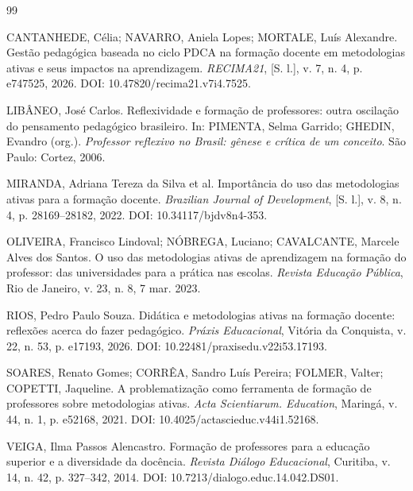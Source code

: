 \begin{thebibliography}{99}

CANTANHEDE, Célia; NAVARRO, Aniela Lopes; MORTALE, Luís Alexandre. Gestão pedagógica baseada no ciclo PDCA na formação docente em metodologias ativas e seus impactos na aprendizagem. \textit{RECIMA21}, [S. l.], v. 7, n. 4, p. e747525, 2026. DOI: 10.47820/recima21.v7i4.7525.

LIBÂNEO, José Carlos. Reflexividade e formação de professores: outra oscilação do pensamento pedagógico brasileiro. In: PIMENTA, Selma Garrido; GHEDIN, Evandro (org.). \textit{Professor reflexivo no Brasil: gênese e crítica de um conceito}. São Paulo: Cortez, 2006.

MIRANDA, Adriana Tereza da Silva et al. Importância do uso das metodologias ativas para a formação docente. \textit{Brazilian Journal of Development}, [S. l.], v. 8, n. 4, p. 28169--28182, 2022. DOI: 10.34117/bjdv8n4-353.

OLIVEIRA, Francisco Lindoval; NÓBREGA, Luciano; CAVALCANTE, Marcele Alves dos Santos. O uso das metodologias ativas de aprendizagem na formação do professor: das universidades para a prática nas escolas. \textit{Revista Educação Pública}, Rio de Janeiro, v. 23, n. 8, 7 mar. 2023.

RIOS, Pedro Paulo Souza. Didática e metodologias ativas na formação docente: reflexões acerca do fazer pedagógico. \textit{Práxis Educacional}, Vitória da Conquista, v. 22, n. 53, p. e17193, 2026. DOI: 10.22481/praxisedu.v22i53.17193.

SOARES, Renato Gomes; CORRÊA, Sandro Luís Pereira; FOLMER, Valter; COPETTI, Jaqueline. A problematização como ferramenta de formação de professores sobre metodologias ativas. \textit{Acta Scientiarum. Education}, Maringá, v. 44, n. 1, p. e52168, 2021. DOI: 10.4025/actascieduc.v44i1.52168.

VEIGA, Ilma Passos Alencastro. Formação de professores para a educação superior e a diversidade da docência. \textit{Revista Diálogo Educacional}, Curitiba, v. 14, n. 42, p. 327--342, 2014. DOI: 10.7213/dialogo.educ.14.042.DS01.



\end{thebibliography}
